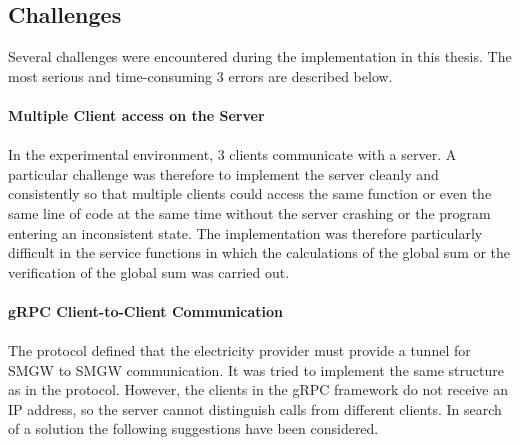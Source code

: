 
\subsection{Challenges}
Several challenges were encountered during the implementation in this thesis. The most serious and time-consuming 3 errors are described below.\\
\\
\textbf{Multiple Client access on the Server}
\\
\\ 
In the experimental environment, 3 clients communicate with a server. A particular challenge was therefore to implement the server cleanly and consistently so that multiple clients could access the same function or even the same line of code  at the same time without the server crashing or the program entering an inconsistent state. The implementation was therefore particularly difficult in the service functions in which the calculations of the global sum or the verification of the global sum was carried out.%
\\
\\
\textbf{gRPC Client-to-Client Communication}
\\
\\
The protocol defined that the electricity provider must provide a tunnel for SMGW to SMGW communication. It was tried to implement the same structure as in the protocol. However, the clients in the gRPC framework do not receive an IP address, so the server cannot distinguish calls from different clients. In search of a solution the following suggestions have been considered. 
